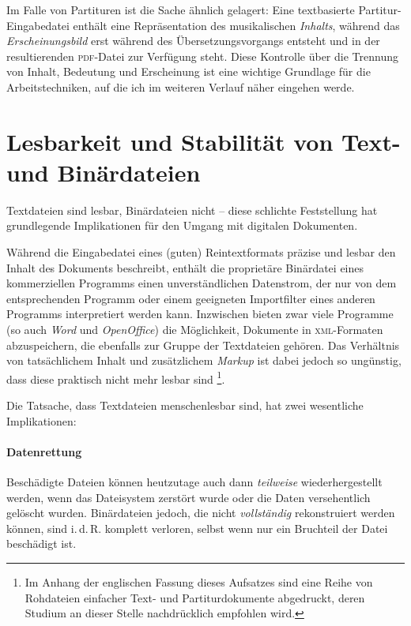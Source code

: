 \documentclass[DIV=12]{scrreprt}
\begin{document}
Im Falle von Partituren ist die Sache ähnlich gelagert:
Eine textbasierte Partitur-Eingabedatei enthält eine Repräsentation des musikalischen \emph{Inhalts}, während das \emph{Erscheinungsbild} erst während des Übersetzungsvorgangs entsteht und in der resultierenden \textsc{pdf}-Datei zur Verfügung steht.
Diese Kontrolle über die Trennung von Inhalt, Bedeutung und Erscheinung ist eine wichtige Grundlage für die Arbeitstechniken, auf die ich im weiteren Verlauf näher eingehen werde.

\section*{Lesbarkeit und Stabilität von Text- und Binärdateien}
\label{sec:pt_readability-stability}
Textdateien sind lesbar, Binärdateien nicht -- diese schlichte Feststellung hat grundlegende Implikationen für den Umgang mit digitalen Dokumenten.

Während die Eingabedatei eines (guten) Reintextformats präzise und lesbar den Inhalt des Dokuments beschreibt, enthält die proprietäre Binärdatei eines kommerziellen Programms einen unverständlichen Datenstrom, der nur von dem entsprechenden Programm oder einem geeigneten Importfilter eines anderen Programms interpretiert werden kann.
Inzwischen bieten zwar viele Programme (so auch \emph{Word} und \emph{OpenOffice}) die Möglichkeit, Dokumente in \textsc{xml}-Formaten abzuspeichern, die ebenfalls zur Gruppe der Textdateien gehören.
Das Verhältnis von tatsächlichem Inhalt und zusätzlichem \emph{Markup} ist dabei jedoch so ungünstig, dass diese praktisch nicht mehr lesbar sind%
\footnote{Im Anhang der englischen Fassung dieses Aufsatzes sind eine Reihe von Rohdateien einfacher Text- und Partiturdokumente abgedruckt, deren Studium an dieser Stelle nachdrücklich empfohlen wird.}.

Die Tatsache, dass Textdateien menschenlesbar sind, hat zwei wesentliche Implikationen:

\paragraph{Datenrettung}
Beschädigte Dateien können heutzutage auch dann \emph{teilweise} wiederhergestellt werden, wenn das Dateisystem zerstört wurde oder die Daten versehentlich gelöscht wurden.
Binärdateien jedoch, die nicht \emph{vollständig} rekonstruiert werden können, sind i.\,d.\,R. komplett verloren, selbst wenn nur ein Bruchteil der Datei beschädigt ist.
\end{document}
